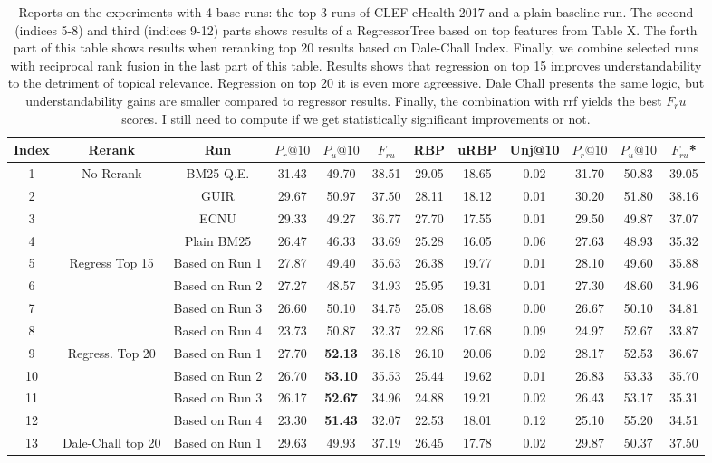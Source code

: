 \begin{table}
\caption{Reports on the experiments with 4 base runs: the top 3 runs of CLEF eHealth 2017 and a plain baseline run. The second (indices 5-8) and third (indices 9-12) parts shows results of a RegressorTree based on top features from Table X. The forth part of this table shows results when reranking top 20 results based on Dale-Chall Index. Finally, we combine selected runs with reciprocal rank fusion in the last part of this table. Results shows that regression on top 15 improves
    understandability to the detriment of topical relevance. Regression on top 20 it is even more agreessive. Dale Chall presents the same logic, but understandability gains are smaller compared to regressor results. Finally, the combination with rrf yields the best $F_ru$ scores. I still need to compute if we get statistically significant improvements or not.}
\label{tab:experiments}
\begin{tabular}{c|c|c|ccc|cc|c|ccc}
\toprule 
    Index & Rerank & Run & $P_r@10$ & $P_u@10$ & $F_{ru}$ & RBP & uRBP & Unj@10 & $P_r@10$ & $P_u@10$ & $F_{ru}${*}\tabularnewline
\midrule 
1 & \multirow{4}{*}{No Rerank} & BM25 Q.E. & 31.43 & 49.70 & 38.51 & 29.05 & 18.65 & 0.02 & 31.70 & 50.83 & 39.05\tabularnewline
2 &  & GUIR & 29.67 & 50.97 & 37.50 & 28.11 & 18.12 & 0.01 & 30.20 & 51.80 & 38.16\tabularnewline
3 &  & ECNU & 29.33 & 49.27 & 36.77 & 27.70 & 17.55 & 0.01 & 29.50 & 49.87 & 37.07\tabularnewline
4 &  & Plain BM25 & 26.47 & 46.33 & 33.69 & 25.28 & 16.05 & 0.06 & 27.63 & 48.93 & 35.32\tabularnewline
\midrule 
5 & \multirow{4}{*}{Regress Top 15} & Based on Run 1 & 27.87 & 49.40 & 35.63 & 26.38 & 19.77 & 0.01 & 28.10 & 49.60 & 35.88\tabularnewline
6 &  & Based on Run 2 & 27.27 & 48.57 & 34.93 & 25.95 & 19.31 & 0.01 & 27.30 & 48.60 & 34.96\tabularnewline
7 &  & Based on Run 3  & 26.60 & 50.10 & 34.75 & 25.08 & 18.68 & 0.00 & 26.67 & 50.10 & 34.81\tabularnewline
8 &  & Based on Run 4 & 23.73 & 50.87 & 32.37 & 22.86 & 17.68 & 0.09 & 24.97 & 52.67 & 33.87\tabularnewline
\midrule 
9 & \multirow{4}{*}{Regress. Top 20} & Based on Run 1 & 27.70 & \textbf{52.13} & 36.18 & 26.10 & 20.06 & 0.02 & 28.17 & 52.53 & 36.67\tabularnewline
10 &  & Based on Run 2 & 26.70 & \textbf{53.10} & 35.53 & 25.44 & 19.62 & 0.01 & 26.83 & 53.33 & 35.70\tabularnewline
11 &  & Based on Run 3  & 26.17 & \textbf{52.67} & 34.96 & 24.88 & 19.21 & 0.02 & 26.43 & 53.17 & 35.31\tabularnewline
12 &  & Based on Run 4 & 23.30 & \textbf{51.43} & 32.07 & 22.53 & 18.01 & 0.12 & 25.10 & 55.20 & 34.51\tabularnewline
\midrule 
13 & \multirow{4}{*}{Dale-Chall top 20} & Based on Run 1 & 29.63 & 49.93 & 37.19 & 26.45 & 17.78 & 0.02 & 29.87 & 50.37 & 37.50\tabularnewline

\end{tabular}
\end{table}
